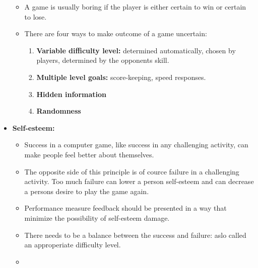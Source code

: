 \begin{itemize}
\begin{itemize}
            \item A game is usually boring if the player is either certain to win or certain to lose. 
            \item There are four ways to make outcome of a game uncertain:
            \begin{enumerate}
              \item {\bf Variable difficulty level:} determined automatically, chosen by players, determined by the opponents skill.
              \item {\bf Multiple level goals:} score-keeping, speed responses.
              \item {\bf Hidden information}
              \item {\bf Randomness}
            \end{enumerate}
          \end{itemize}
        \item {\bf Self-esteem:}
          \begin{itemize}
            \item Success in a computer game, like success in any challenging activity, can make people feel better about themselves. 
            \item The opposite side of this principle is of cource failure in a challenging activity. Too much failure can lower a person self-esteem and can decrease a persons desire to play the game again.
            \item Performance measure feedback should be presented in a way that minimize the possibility of self-esteem damage. 
            \item There needs to be a balance between the success and failure: aslo called an approperiate difficulty level.
            \item 
          \end{itemize}
      \end{itemize}

